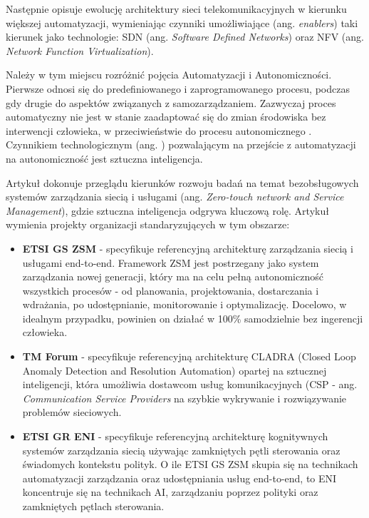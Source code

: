Następnie \cite{doyle2014} opisuje ewolucję architektury sieci telekomunikacyjnych w kierunku większej automatyzacji, wymieniając czynniki umożliwiające (ang. \textit{enablers}) taki kierunek jako technologie: SDN (ang. \textit{Software Defined Networks}) oraz NFV (ang. \textit{Network Function Virtualization}).

Należy w tym miejscu rozróżnić pojęcia Automatyzacji i Autonomiczności. Pierwsze odnosi się do predefiniowanego i zaprogramowanego procesu, podczas gdy drugie do aspektów związanych z samozarządzaniem. Zazwyczaj proces automatyczny nie jest w stanie zaadaptować się do zmian środowiska bez interwencji człowieka, w przeciwieństwie do procesu autonomicznego \cite{ngmn2022}. Czynnikiem technologicznym (ang. ) pozwalającym na przejście z automatyzacji na autonomiczność jest sztuczna inteligencja.

Artykuł \cite{benzaid2020} dokonuje przeglądu kierunków rozwoju badań na temat bezobsługowych systemów zarządzania siecią i usługami (ang. \textit{Zero-touch network and Service Management}), gdzie sztuczna inteligencja odgrywa kluczową rolę. Artykuł wymienia projekty organizacji standaryzujących w tym obszarze:
\begin{itemize}
    \item \textbf{ETSI GS ZSM} - specyfikuje referencyjną architekturę zarządzania siecią i usługami end-to-end. Framework ZSM jest postrzegany jako system zarządzania nowej generacji, który ma na celu pełną autonomiczność wszystkich procesów - od planowania, projektowania, dostarczania i wdrażania, po udostępnianie, monitorowanie i optymalizację. Docelowo, w idealnym przypadku, powinien on działać w 100\% samodzielnie bez ingerencji człowieka. 
    \item \textbf{TM Forum} - specyfikuje referencyjną architekturę CLADRA (Closed Loop Anomaly Detection and Resolution Automation) opartej na sztucznej inteligencji, która umożliwia dostawcom usług komunikacyjnych (CSP - ang. \textit{Communication Service Providers} na szybkie wykrywanie i rozwiązywanie problemów sieciowych.
    \item \textbf{ETSI GR ENI} - specyfikuje referencyjną architekturę kognitywnych systemów zarządzania siecią używając zamkniętych pętli sterowania oraz świadomych kontekstu polityk. O ile ETSI GS ZSM skupia się na technikach automatyzacji zarządzania oraz udostępniania usług end-to-end, to ENI koncentruje się na technikach AI, zarządzaniu poprzez polityki oraz zamkniętych pętlach sterowania.
\end{itemize}

